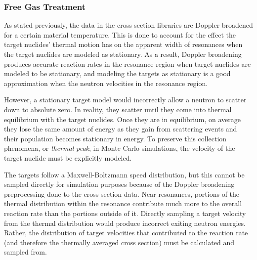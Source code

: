 \subsubsection{Free Gas Treatment}

As stated previously, the data in the cross section libraries are Doppler broadened for a certain material temperature.  This is done to account for the effect the target nuclides' thermal motion has on the apparent width of resonances when the target nuclides are modeled as stationary. As a result, Doppler broadening produces accurate reaction rates in the resonance region when target nuclides are modeled to be stationary, and modeling the targets as stationary is a good approximation when the neutron velocities in the resonance region. 

However, a stationary target model would incorrectly allow a neutron to scatter down to absolute zero.  In reality, they scatter until they come into thermal equilibrium with the target nuclides.  Once they are in equilibrium, on average they lose the same amount of energy as they gain from scattering events and their population becomes stationary in energy.  To preserve this collection phenomena, or \emph{thermal peak}, in Monte Carlo simulations, the velocity of the target nuclide must be explicitly modeled.  


The targets follow a Maxwell-Boltzmann speed distribution, but this cannot be sampled directly for simulation purposes because of the Doppler broadening preprocessing done to the cross section data.  Near resonances, portions of the thermal distribution within the resonance contribute much more to the overall reaction rate than the portions outside of it.  Directly sampling a target velocity from the thermal distribution would produce incorrect exiting neutron energies.  Rather, the distribution of target velocities that contributed to the reaction rate (and therefore the thermally averaged cross section) must be calculated and sampled from.

